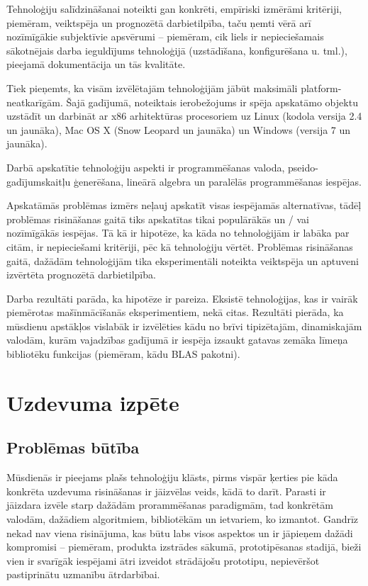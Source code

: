\documentclass{ludis}
\begin{document}
Tehnoloģiju salīdzināšanai noteikti gan konkrēti, empīriski izmērāmi kritēriji, piemēram, veiktspēja un prognozētā darbietilpība, taču ņemti vērā arī nozīmīgākie subjektīvie apsvērumi -- piemēram, cik liels ir nepieciešamais sākotnējais darba ieguldījums tehnoloģijā (uzstādīšana, konfigurēšana u. tml.), pieejamā dokumentācija un tās kvalitāte.

Tiek pieņemts, ka visām izvēlētajām tehnoloģijām jābūt maksimāli platform-neatkarīgām. Šajā gadījumā, noteiktais ierobežojums ir spēja apskatāmo objektu uzstādīt un darbināt ar x86 arhitektūras procesoriem uz Linux (kodola versija 2.4 un jaunāka), Mac OS X (Snow Leopard un jaunāka) un Windows (versija 7 un jaunāka).

Darbā apskatītie tehnoloģiju aspekti ir programmēšanas valoda, pseido-gadījumskaitļu ģenerēšana, lineārā algebra un paralēlās programmēšanas iespējas.

Apskatāmās problēmas izmērs neļauj apskatīt visas iespējamās alternatīvas, tādēļ problēmas risināšanas gaitā tiks apskatītas tikai populārākās un / vai nozīmīgākās iespējas. Tā kā ir hipotēze, ka kāda no tehnoloģijām ir labāka par citām, ir nepieciešami kritēriji, pēc kā tehnoloģiju vērtēt. Problēmas risināšanas gaitā, dažādām tehnoloģijām tika eksperimentāli noteikta veiktspēja un aptuveni izvērtēta prognozētā darbietilpība.

Darba rezultāti parāda, ka hipotēze ir pareiza. Eksistē tehnoloģijas, kas ir vairāk piemērotas mašīnmācīšanās eksperimentiem, nekā citas. Rezultāti pierāda, ka mūsdienu apstākļos vislabāk ir izvēlēties kādu no brīvi tipizētajām, dinamiskajām valodām, kurām vajadzības gadījumā ir iespēja izsaukt gatavas zemāka līmeņa bibliotēku funkcijas (piemēram, kādu BLAS pakotni).

\chapter{Uzdevuma izpēte}
\section{Problēmas būtība}
Mūsdienās ir pieejams plašs tehnoloģiju klāsts, pirms vispār ķerties pie kāda konkrēta uzdevuma risināšanas ir jāizvēlas veids, kādā to darīt. Parasti ir jāizdara izvēle starp dažādām prorammēšanas paradigmām, tad konkrētām valodām, dažādiem algoritmiem, bibliotēkām un ietvariem, ko izmantot. Gandrīz nekad nav viena risinājuma, kas būtu labs visos aspektos un ir jāpieņem dažādi kompromisi -- piemēram, produkta izstrādes sākumā, prototipēsanas stadijā, bieži vien ir svarīgāk iespējami ātri izveidot strādājošu prototipu, nepievēršot pastiprinātu uzmanību ātrdarbībai.
\end{document}
